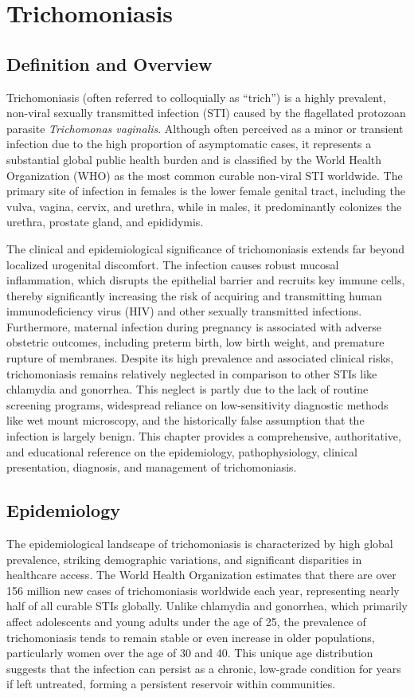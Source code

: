\chapter{Trichomoniasis}

\section*{Definition and Overview}
Trichomoniasis (often referred to colloquially as ``trich'') is a highly prevalent, non-viral sexually transmitted infection (STI) caused by the flagellated protozoan parasite \textit{Trichomonas vaginalis}. Although often perceived as a minor or transient infection due to the high proportion of asymptomatic cases, it represents a substantial global public health burden and is classified by the World Health Organization (WHO) as the most common curable non-viral STI worldwide. The primary site of infection in females is the lower female genital tract, including the vulva, vagina, cervix, and urethra, while in males, it predominantly colonizes the urethra, prostate gland, and epididymis.

The clinical and epidemiological significance of trichomoniasis extends far beyond localized urogenital discomfort. The infection causes robust mucosal inflammation, which disrupts the epithelial barrier and recruits key immune cells, thereby significantly increasing the risk of acquiring and transmitting human immunodeficiency virus (HIV) and other sexually transmitted infections. Furthermore, maternal infection during pregnancy is associated with adverse obstetric outcomes, including preterm birth, low birth weight, and premature rupture of membranes. Despite its high prevalence and associated clinical risks, trichomoniasis remains relatively neglected in comparison to other STIs like chlamydia and gonorrhea. This neglect is partly due to the lack of routine screening programs, widespread reliance on low-sensitivity diagnostic methods like wet mount microscopy, and the historically false assumption that the infection is largely benign. This chapter provides a comprehensive, authoritative, and educational reference on the epidemiology, pathophysiology, clinical presentation, diagnosis, and management of trichomoniasis.

\section*{Epidemiology}
The epidemiological landscape of trichomoniasis is characterized by high global prevalence, striking demographic variations, and significant disparities in healthcare access. The World Health Organization estimates that there are over 156 million new cases of trichomoniasis worldwide each year, representing nearly half of all curable STIs globally. Unlike chlamydia and gonorrhea, which primarily affect adolescents and young adults under the age of 25, the prevalence of trichomoniasis tends to remain stable or even increase in older populations, particularly women over the age of 30 and 40. This unique age distribution suggests that the infection can persist as a chronic, low-grade condition for years if left untreated, forming a persistent reservoir within communities.

